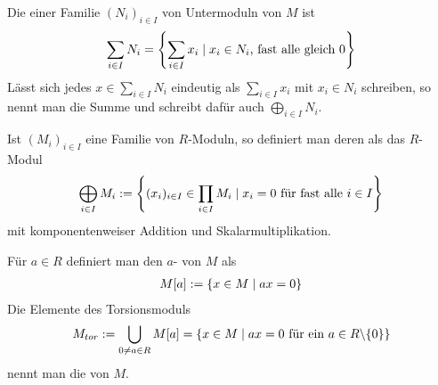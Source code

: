 \begin{definition}
	Die  einer Familie $(N_i)_{i\in I}$ von Untermoduln von $M$ ist
	\begin{align}
		\sum_{i\in I} N_i=\left\lbrace \sum_{i\in I} x_i\mid x_i\in N_i\text{, fast alle gleich 0}\right\rbrace \notag
	\end{align}
	Lässt sich jedes $x\in\sum_{i\in I} N_i$ eindeutig als $\sum_{i\in I} x_i$ mit $x_i\in N_i$ schreiben, so nennt man die Summe  und schreibt dafür auch $\bigoplus_{i\in I} N_i$.
	
	Ist $(M_i)_{i\in I}$ eine Familie von $R$-Moduln, so definiert man deren  als das $R$-Modul 
	\begin{align}
		\bigoplus_{i\in I} M_i := \left\lbrace (x_i)_{i\in I}\in \prod_{i\in I} M_i\mid x_i=0\text{ für fast alle } i\in I\right\rbrace \notag
	\end{align}
	mit komponentenweiser Addition und Skalarmultiplikation.
\end{definition}

\begin{definition}[Torsionsmodul]
	Für $a\in R$ definiert man den $a$- von $M$ als
	\begin{align}
		M[a]:=\{x\in M\mid ax=0\}\notag
	\end{align}
	Die Elemente des Torsionsmoduls
	\begin{align}
		M_{tor}:=\bigcup_{0\neq a\in R} M[a]=\{x\in M\mid ax=0\text{ für ein } a\in R\backslash\{0\}\}\notag
	\end{align}
	nennt man die  von $M$.
\end{definition}